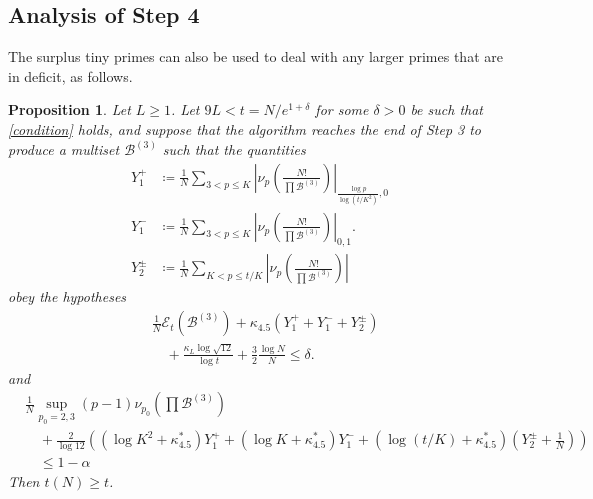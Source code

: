 \documentclass[12pt,a4paper,reqno]{amsart}
\numberwithin{equation}{section}
\theoremstyle{plain}
\newtheorem{proposition}[theorem]{Proposition}
\theoremstyle{definition}
\newcommand\tuple{{\mathcal B}}
\newcommand\excess{{\mathcal{E}}}
\begin{document}
\subsection{Analysis of Step 4}

The surplus tiny primes can also be used to deal with any larger primes that are in deficit, as follows.

\begin{proposition}\label{step4-reduce}  Let $L \geq 1$.  Let $9L < t = N/e^{1+\delta}$ for some $\delta>0$ be such that \eqref{condition} holds, and suppose that the algorithm reaches the end of Step 3 to produce a multiset $\tuple^{(3)}$ such that the quantities
  \begin{align}
    Y_1^+ &\coloneqq \frac{1}{N} \sum_{3 < p \leq K} \left|\nu_p\left(\frac{N!}{\prod \tuple^{(3)}}\right)\right|_{\frac{\log p}{\log (t/K^2)},0}  \label{y1p-def}\\
    Y_1^- &\coloneqq \frac{1}{N} \sum_{3 < p \leq K} \left|\nu_p\left(\frac{N!}{\prod \tuple^{(3)}}\right)\right|_{0,1}.\label{y1m-def} \\
    Y^\pm_2 &\coloneqq \frac{1}{N} \sum_{K < p \leq t/K} \left|\nu_p\left(\frac{N!}{\prod \tuple^{(3)}}\right)\right|\label{y2pm-def}
  \end{align}
    obey the hypotheses
\begin{equation}\label{new-balance-5}
    \begin{split}
&     \frac{1}{N} \excess_t(\tuple^{(3)}) + \kappa_{4.5} (Y_1^+ + Y_1^- + Y_2^\pm)\\
&\quad + \frac{\kappa_L \log \sqrt{12}}{\log t} + \frac{3}{2} \frac{\log N}{N}  \leq \delta.
    \end{split}
  \end{equation}
and
  \begin{equation}\label{nstarb}
    \begin{split}
&\frac{1}{N} \sup_{p_0=2,3} (p-1) \nu_{p_0}\left(\prod \tuple^{(3)}\right) \\
&\quad + \frac{2}{\log 12} \left( (\log K^2 +\kappa^*_{4.5}) Y_1^+ + (\log K + \kappa^*_{4.5}) Y_1^- + (\log(t/K) +\kappa^*_{4.5}) (Y_2^\pm+\frac{1}{N})  \right)
\\
  &\quad  \leq 1-\alpha
  \end{split}
\end{equation}
     Then $t(N) \geq t$.
\end{proposition}
\end{document}
